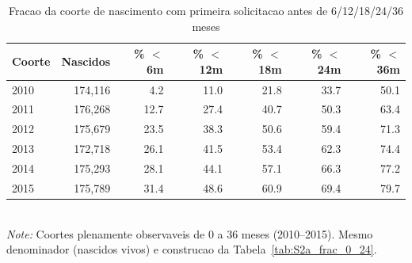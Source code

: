 \begin{table}[htbp]\centering
\caption{Fracao da coorte de nascimento com primeira solicitacao antes de 6/12/18/24/36 meses}
\label{tab:S2b_frac_0_36}
\small
\begin{tabular}{lrrrrrr}
\toprule
Coorte & Nascidos & \% $<$6m & \% $<$12m & \% $<$18m & \% $<$24m & \% $<$36m \\
\midrule
2010 & 174,116 & 4.2 & 11.0 & 21.8 & 33.7 & 50.1 \\
2011 & 176,268 & 12.7 & 27.4 & 40.7 & 50.3 & 63.4 \\
2012 & 175,679 & 23.5 & 38.3 & 50.6 & 59.4 & 71.3 \\
2013 & 172,718 & 26.1 & 41.5 & 53.4 & 62.3 & 74.4 \\
2014 & 175,293 & 28.1 & 44.1 & 57.1 & 66.3 & 77.2 \\
2015 & 175,789 & 31.4 & 48.6 & 60.9 & 69.4 & 79.7 \\
\bottomrule
\end{tabular}
\\[3pt]{\footnotesize \textit{Note:} Coortes plenamente observaveis de 0 a 36 meses (2010--2015). Mesmo denominador (nascidos vivos) e construcao da Tabela~\ref{tab:S2a_frac_0_24}.}
\end{table}
